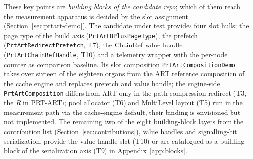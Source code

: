\begin{nurkurz}
These key points are \emph{building blocks of the candidate repo}; which of them reach the measurement
apparatus is decided by the slot assignment (Section~\ref{sec:prtart-demo}). The candidate under test
provides four slot hulls: the page type of the build axis (\texttt{PrtArtBPlusPageType}), the prefetch
(\texttt{PrtArtRedirectPrefetch}, T7), the ChainRef value handle (\texttt{PrtArtChainRefHandle}, T10)
and a telemetry wrapper with the per-node counter as comparison baseline. Its slot composition
\texttt{PrtArtCompositionDemo} takes over sixteen of the eighteen organs from the ART reference
composition of the cache engine and replaces prefetch and value handle; the engine-side
\texttt{PrtArtComposition} differs from ART only in the path-compression redirect (T3, the \emph{R} in
PRT-ART); pool allocator (T6) and MultiLevel layout (T5) run in the measurement path via the
cache-engine default, their binding is envisioned but not implemented. The remaining two of the eight
building-block layers from the contribution list (Section~\ref{sec:contributions}), value handles and
signalling-bit serialization, provide the value-handle slot (T10) or are catalogued as a building block
of the serialization axis (T9) in Appendix~\ref{app:blocks}.
\end{nurkurz}

